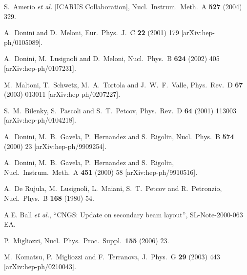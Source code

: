 \documentclass[12pt]{elsart}
\begin{document}
\begin{thebibliography}{99}
  S.~Amerio {\it et al.}  [ICARUS Collaboration],
  Nucl.\ Instrum.\ Meth.\  A {\bf 527} (2004) 329.

  A.~Donini and D.~Meloni,
  Eur.\ Phys.\ J.\  C {\bf 22} (2001) 179
  [arXiv:hep-ph/0105089].

  A.~Donini, M.~Lusignoli and D.~Meloni,
  Nucl.\ Phys.\  B {\bf 624} (2002) 405
  [arXiv:hep-ph/0107231].

  M.~Maltoni, T.~Schwetz, M.~A.~Tortola and J.~W.~F.~Valle,
  Phys.\ Rev.\  D {\bf 67} (2003) 013011
  [arXiv:hep-ph/0207227].

  S.~M.~Bilenky, S.~Pascoli and S.~T.~Petcov,
  Phys.\ Rev.\  D {\bf 64} (2001) 113003
  [arXiv:hep-ph/0104218].

  A.~Donini, M.~B.~Gavela, P.~Hernandez and S.~Rigolin,
  Nucl.\ Phys.\  B {\bf 574} (2000) 23
  [arXiv:hep-ph/9909254].

  A.~Donini, M.~B.~Gavela, P.~Hernandez and S.~Rigolin,
  Nucl.\ Instrum.\ Meth.\  A {\bf 451} (2000) 58
  [arXiv:hep-ph/9910516].

  A.~De Rujula, M.~Lusignoli, L.~Maiani, S.~T.~Petcov and R.~Petronzio,
  Nucl.\ Phys.\  B {\bf 168} (1980) 54.

  A.E. Ball {\it et al.},
  ``CNGS: Update on secondary beam layout'',
  SL-Note-2000-063 EA.
  
  P.~Migliozzi,
  Nucl.\ Phys.\ Proc.\ Suppl.\  {\bf 155} (2006) 23.

  M.~Komatsu, P.~Migliozzi and F.~Terranova,
  J.\ Phys.\ G {\bf 29} (2003) 443
  [arXiv:hep-ph/0210043].

\end{thebibliography}
\end{document}
